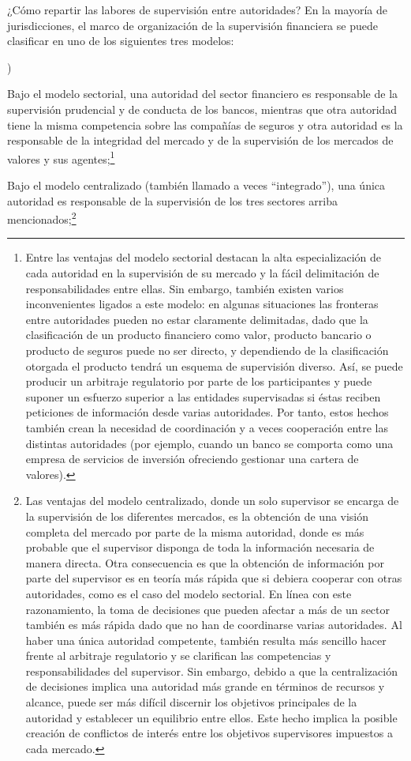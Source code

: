 \documentclass[10pt,a4paper]{article}
\newcounter{alphaitem}
\newenvironment{la}
      {\begin{list}{\alph{alphaitem})}{%
          \usecounter{alphaitem}%
          \setlength{\leftmargin}{1cm}%
          \setlength{\parskip}{3pt}%
          \setlength{\itemsep}{0pt}%
          \setlength{\parsep}{0pt}%
      }}
      {\end{list}}
\begin{document}
¿Cómo repartir las labores de supervisión entre autoridades? En la mayoría de jurisdicciones, el marco de organización de la supervisión financiera se puede clasificar en uno de los siguientes tres modelos: 
\begin{la}
    \item Bajo el modelo sectorial, una autoridad del sector financiero es responsable de la supervisión prudencial y de conducta de los bancos, mientras que otra autoridad tiene la misma competencia sobre las compañías de seguros y otra autoridad es la responsable de la integridad del mercado y de la supervisión de los mercados de valores y sus agentes;\footnote{%
        Entre las ventajas del modelo sectorial destacan la alta especialización de cada autoridad en la supervisión de su mercado y la fácil delimitación de responsabilidades entre ellas. Sin embargo, también existen varios inconvenientes ligados a este modelo: en algunas situaciones las fronteras entre autoridades pueden no estar claramente delimitadas, dado que la clasificación de un producto financiero como valor, producto bancario o producto de seguros puede no ser directo, y dependiendo de la clasificación otorgada el producto tendrá un esquema de supervisión diverso. Así, se puede producir un arbitraje regulatorio por parte de los participantes y puede suponer un esfuerzo superior a las entidades supervisadas si éstas reciben peticiones de información desde varias autoridades. Por tanto, estos hechos también crean la necesidad de coordinación y a veces cooperación entre las distintas autoridades (por ejemplo, cuando un banco se comporta como una empresa de servicios de inversión ofreciendo gestionar una cartera de valores).
    }
    \item Bajo el modelo centralizado (también llamado a veces “integrado”), una única autoridad es responsable de la supervisión de los tres sectores arriba mencionados;\footnote{%
        Las ventajas del modelo centralizado, donde un solo supervisor se encarga de la supervisión de los diferentes mercados, es la obtención de una visión completa del mercado por parte de la misma autoridad, donde es más probable que el supervisor disponga de toda la información necesaria de manera directa. Otra consecuencia es que la obtención de información por parte del supervisor es en teoría más rápida que si debiera cooperar con otras autoridades, como es el caso del modelo sectorial. En línea con este razonamiento, la toma de decisiones que pueden afectar a más de un sector también es más rápida dado que no han de coordinarse varias autoridades. Al haber una única autoridad competente, también resulta más sencillo hacer frente al arbitraje regulatorio y se clarifican las competencias y responsabilidades del supervisor. Sin embargo, debido a que la centralización de decisiones implica una autoridad más grande en términos de recursos y alcance, puede ser más difícil discernir los objetivos principales de la autoridad y establecer un equilibrio entre ellos. Este hecho implica la posible creación de conflictos de interés entre los objetivos supervisores impuestos a cada mercado.
}
\end{la}
\end{document}
